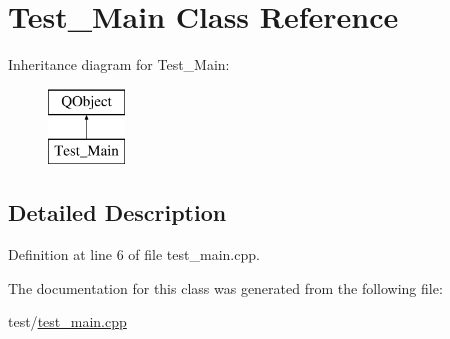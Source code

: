 \hypertarget{class_test___main}{}\section{Test\+\_\+\+Main Class Reference}
\label{class_test___main}
Inheritance diagram for Test\+\_\+\+Main\+:\begin{figure}[H]
\begin{center}
\leavevmode
\includegraphics[height=2.000000cm]{class_test___main}
\end{center}
\end{figure}


\subsection{Detailed Description}


Definition at line 6 of file test\+\_\+main.\+cpp.



The documentation for this class was generated from the following file\+:\begin{DoxyCompactItemize}
\item 
test/\hyperlink{test__main_8cpp}{test\+\_\+main.\+cpp}\end{DoxyCompactItemize}
